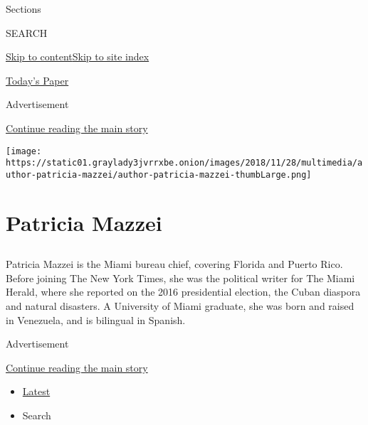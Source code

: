 Sections

SEARCH

\protect\hyperlink{site-content}{Skip to
content}\protect\hyperlink{site-index}{Skip to site index}

\href{https://myaccount.nytimes3xbfgragh.onion/auth/login?response_type=cookie\&client_id=vi}{}

\href{https://www.nytimes3xbfgragh.onion/section/todayspaper}{Today's
Paper}

Advertisement

\protect\hyperlink{after-top}{Continue reading the main story}

\texttt{[image: https://static01.graylady3jvrrxbe.onion/images/2018/11/28/multimedia/author-patricia-mazzei/author-patricia-mazzei-thumbLarge.png]}

\hypertarget{patricia-mazzei}{%
\section{Patricia Mazzei}\label{patricia-mazzei}}

\subsection{}

Patricia Mazzei is the Miami bureau chief, covering Florida and Puerto
Rico. Before joining The New York Times, she was the political writer
for The Miami Herald, where she reported on the 2016 presidential
election, the Cuban diaspora and natural disasters. A University of
Miami graduate, she was born and raised in Venezuela, and is bilingual
in Spanish.

Advertisement

\protect\hyperlink{after-mid1}{Continue reading the main story}

\begin{itemize}
\tightlist
\item
  \protect\hyperlink{stream-panel}{Latest}
\item
  Search
\end{itemize}

